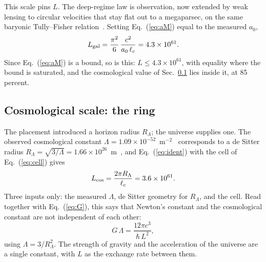 \documentclass[aps,prd,twocolumn,superscriptaddress,nofootinbib,showkeys]{revtex4-2}
\newcommand{\lc}{\ell_c}
\newcommand{\RL}{R_\Lambda}
\begin{document}
This scale pins $L$. The deep-regime law is observation, now extended by weak lensing to circular velocities that stay flat out to a megaparsec, on the same baryonic Tully--Fisher relation~\cite{mistele2024}. Setting Eq.~(\ref{eq:aM}) equal to the measured $a_0$,
\begin{equation}
L_{\rm gal} = \frac{\pi^2}{6}\,\frac{c^2}{a_0\,\lc} = 4.3\times10^{61}.
\label{eq:Lgal}
\end{equation}
Since Eq.~(\ref{eq:aM}) is a bound, so is this: $L \le 4.3\times10^{61}$, with equality where the bound is saturated, and the cosmological value of Sec.~\ref{sec:cosmo} lies inside it, at 85 percent.

\subsection{Cosmological scale: the ring}
\label{sec:cosmo}

The placement introduced a horizon radius $\RL$; the universe supplies one. The observed cosmological constant $\Lambda = 1.09\times10^{-52}$~m$^{-2}$~\cite{planck2018} corresponds to a de Sitter radius $\RL = \sqrt{3/\Lambda} = 1.66\times10^{26}$~m~\cite{gibbons1977}, and Eq.~(\ref{eq:ident}) with the cell of Eq.~(\ref{eq:cell}) gives
\begin{equation}
L_{\rm cos} = \frac{2\pi\RL}{\lc} = 3.6\times10^{61}.
\label{eq:Lcos}
\end{equation}
Three inputs only: the measured $\Lambda$, de Sitter geometry for $\RL$, and the cell. Read together with Eq.~(\ref{eq:G}), this says that Newton's constant and the cosmological constant are not independent of each other:
\begin{equation}
G\,\Lambda = \frac{12\pi c^3}{\hbar\,L^2},
\label{eq:Lambda}
\end{equation}
using $\Lambda = 3/\RL^2$. The strength of gravity and the acceleration of the universe are a single constant, with $L$ as the exchange rate between them.
\end{document}
